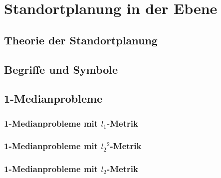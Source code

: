 \section{Standortplanung in der Ebene} %
    \label{sec:standortplanung_in_der_ebene}

      \subsection{Theorie der Standortplanung} %
      \label{sub:theorie_der_standortplanung}
      

      \subsection{Begriffe und Symbole} %
      \label{sub:begriffe_und_symbole}
      

      \subsection{1-Medianprobleme} %
      \label{sub:1_medianprobleme}

        \subsubsection{1-Medianprobleme mit $l_1$-Metrik} %
        \label{ssub:1_medianprobleme_mit_l1_Metrik}
        

        \subsubsection{1-Medianprobleme mit ${l_2}^{2}$-Metrik} %
        \label{ssub:1_medianprobleme_mit_l2^2_Metrik}
        

        \subsubsection{1-Medianprobleme mit $l_2$-Metrik} %
        \label{ssub:1_medianprobleme_mit_l2_Metrik}
        
      

